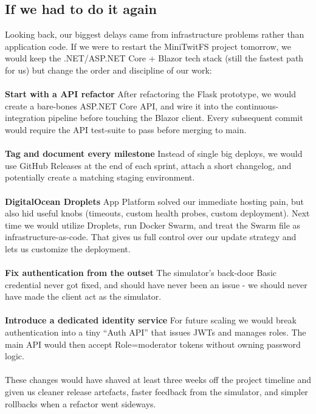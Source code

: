 \subsection{If we had to do it again}
Looking back, our biggest delays came from infrastructure problems rather than application code. If we were to restart the MiniTwitFS project tomorrow, we would keep the .NET/ASP.NET Core + Blazor tech stack (still the fastest path for us) but change the order and discipline of our work:\\\\
\textbf{Start with a API refactor}
After refactoring the Flask prototype, we would create a bare-bones ASP.NET Core API, and wire it into the continuous-integration pipeline before touching the Blazor client. Every subsequent commit would require the API test-suite to pass before merging to main.\\\\
\textbf{Tag and document every milestone}
Instead of single big deploys, we would use GitHub Releases at the end of each sprint, attach a short changelog, and potentially create a matching staging environment.\\\\
\textbf{DigitalOcean Droplets}
App Platform solved our immediate hosting pain, but also hid useful knobs (timeouts, custom health probes, custom deployment). Next time we would utilize Droplets, run Docker Swarm, and treat the Swarm file as infrastructure-as-code. That gives us full control over our update strategy and lets us customize the deployment.\\\\
\textbf{Fix authentication from the outset}
The simulator’s back-door Basic credential never got fixed, and should have never been an issue - we should never have made the client act as the simulator.\\\\
\textbf{Introduce a dedicated identity service}
For future scaling we would break authentication into a tiny “Auth API” that issues JWTs and manages roles. The main API would then accept Role=moderator tokens without owning password logic.\\\\
These changes would have shaved at least three weeks off the project timeline and given us cleaner release artefacts, faster feedback from the simulator, and simpler rollbacks when a refactor went sideways.